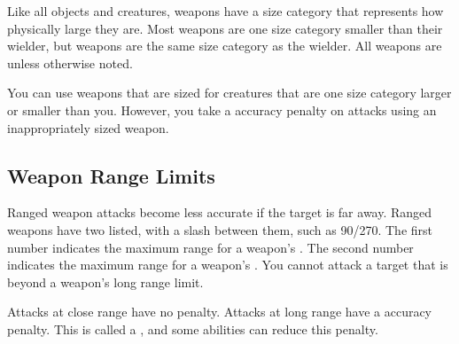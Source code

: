        Like all objects and creatures, weapons have a size category that represents how physically large they are. Most weapons are one size category smaller than their wielder, but  weapons are the same size category as the wielder.
      All weapons are  unless otherwise noted.

       You can use weapons that are sized for creatures that are one size category larger or smaller than you.
      However, you take a  accuracy penalty on attacks using an inappropriately sized weapon.

  \subsection{Weapon Range Limits}\label{Weapon Range Limits}
    Ranged weapon attacks become less accurate if the target is far away.
    Ranged weapons have two  listed, with a slash between them, such as 90/270.
    The first number indicates the maximum range for a weapon's .
    The second number indicates the maximum range for a weapon's .
    You cannot attack a target that is beyond a weapon's long range limit.

    Attacks at close range have no penalty.
    Attacks at long range have a  accuracy penalty.
    This is called a , and some abilities can reduce this penalty.

